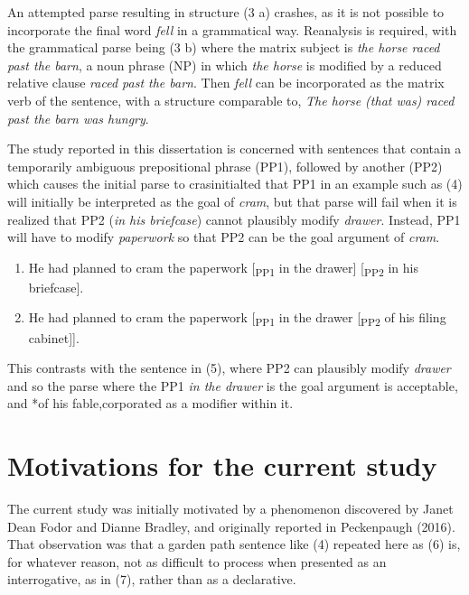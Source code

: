 \documentclass[12pt,oneside]{book}
\begin{document}
An attempted parse resulting in structure (3 a) crashes, as it is not possible to incorporate the final word \emph{fell} in a grammatical way. Reanalysis is required, with the grammatical parse being (3 b) where the matrix subject is \emph{the horse raced past the barn}, a noun phrase (NP) in which \emph{the horse} is modified by a reduced relative clause \emph{raced past the barn}. Then \emph{fell} can be incorporated as the matrix verb of the sentence, with a structure comparable to, \emph{The horse (that was) raced past the barn was hungry}.

The study reported in this dissertation is concerned with sentences that contain a temporarily ambiguous prepositional phrase (PP1), followed by another (PP2) which causes the initial parse to crasinitialted that PP1 in an example such as (4) will initially be interpreted as the goal of \emph{cram}, but that parse will fail when it is realized that PP2 (\emph{in his briefcase}) cannot plausibly modify \emph{drawer}. Instead, PP1 will have to modify \emph{paperwork} so that PP2 can be the goal argument of \emph{cram}.

\begin{enumerate}
\def\labelenumi{(\arabic{enumi})}
\setcounter{enumi}{3}
\item
  He had planned to cram the paperwork {[}\textsubscript{PP1} in the drawer{]} {[}\textsubscript{PP2} in his briefcase{]}.
\item
  He had planned to cram the paperwork {[}\textsubscript{PP1} in the drawer {[}\textsubscript{PP2} of his filing cabinet{]}{]}.
\end{enumerate}

This contrasts with the sentence in (5), where PP2 can plausibly modify \emph{drawer} and so the parse where the PP1 \emph{in the drawer} is the goal argument is acceptable, and *of his fable,corporated as a modifier within it.

\hypertarget{obs}{%
\section{Motivations for the current study}\label{obs}}

The current study was initially motivated by a phenomenon discovered by Janet Dean Fodor and Dianne Bradley, and originally reported in Peckenpaugh (2016). That observation was that a garden path sentence like (4) repeated here as (6) is, for whatever reason, not as difficult to process when presented as an interrogative, as in (7), rather than as a declarative.
\end{document}
